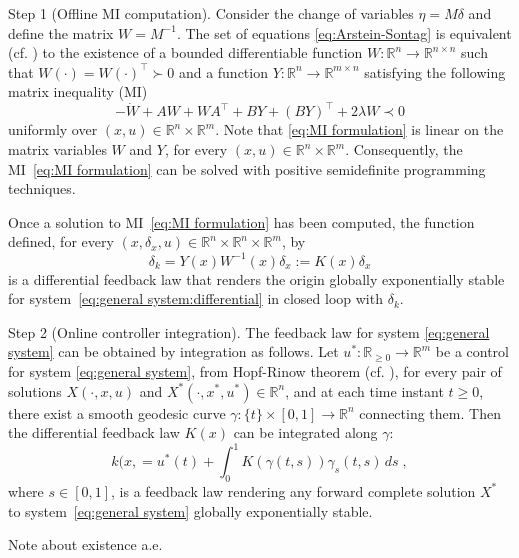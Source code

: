 \documentclass[10pt,twocolumn,twoside]{IEEEtran}
\newcounter{para}
\newcommand\mypara{\par}
\theoremstyle{plain}
\theoremstyle{definition}
\theoremstyle{remark}
\begin{document}
\mypara Step 1 (Offline MI computation). Consider the change of variables $\eta=M\delta$ and define the matrix $W=M^{-1}$. The set of equations \eqref{eq:Arstein-Sontag} is equivalent (cf. \cite[Lemma 11.1]{CalafioreGhaoui2014}) to the existence of a bounded differentiable function $W:\mathbb{R}^n\to\mathbb{R}^{n\times n}$ such that $W(\cdot)=W(\cdot)^\top\succ0$ and a function $Y:\mathbb{R}^n\to\mathbb{R}^{m\times n}$ satisfying the following matrix inequality (MI)
\begin{equation}\label{eq:MI formulation}
	-\dot{W}+AW+WA^\top+BY+(BY)^\top+2\lambda W\prec0
\end{equation}
uniformly over $(x,u)\in\mathbb{R}^n\times\mathbb{R}^m$. Note that \eqref{eq:MI formulation} is linear on the matrix variables $W$ and $Y$, for every $(x,u)\in\mathbb{R}^n\times\mathbb{R}^m$. Consequently, the MI~\eqref{eq:MI formulation} can be solved with positive semidefinite programming techniques.

\mypara Once a solution to MI~\eqref{eq:MI formulation} has been computed, the function defined, for every $(x,\delta_x,u)\in\mathbb{R}^n\times\mathbb{R}^n\times\mathbb{R}^m$, by
	\begin{equation}\label{eq:differential feedback law}
		\delta_k=Y(x)W^{-1}(x)\delta_x:=K(x)\delta_x
	\end{equation}
	is a differential feedback law that renders the origin globally exponentially stable for system~\eqref{eq:general system:differential} in closed loop with $\delta_k$.

\mypara Step 2 (Online controller integration). The feedback law for system \eqref{eq:general system} can be obtained by integration as follows. Let $u^\ast:\mathbb{R}_{\geq0}\to\mathbb{R}^m$ be a control for system \eqref{eq:general system}, from Hopf-Rinow theorem (cf. \cite[Theorem 7.7]{Boothby1986}), for every pair of solutions $X(\cdot,x,u)$ and $X^\ast(\cdot,x^\ast,u^\ast)\in\mathbb{R}^n$, and at each time instant $t\geq0$,  there exist a smooth geodesic curve $\gamma:\{t\}\times [0,1]\to\mathbb{R}^n$ connecting them. Then the differential feedback law $K(x)$ can be integrated along $\gamma$:
\begin{equation}\label{eq:contracting feedback law}
	k(x,=u^\ast(t)+\int_0^1 K(\gamma(t,s))\gamma_s(t,s)\,ds\;,
\end{equation}
where $s\in[0,1]$, is a feedback law rendering any forward complete solution $X^\ast$ to system~\eqref{eq:general system} globally exponentially stable.

Note about existence a.e.
\end{document}
